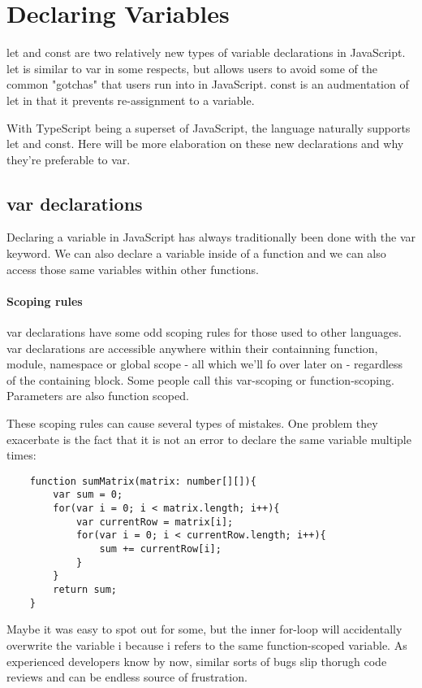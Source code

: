 \chapter{Declaring Variables}
let and const are two relatively new types of variable declarations in JavaScript. let is similar to var in some respects, but allows users to avoid some of the common "gotchas" that users run into in JavaScript. const is an audmentation of let in that it prevents re-assignment to a variable.

With TypeScript being a superset of JavaScript, the language naturally supports let and const. Here will be more elaboration on these new declarations and why they're preferable to var.

\section{var declarations}
Declaring a variable in JavaScript has always traditionally been done with the var keyword. We can also declare a variable inside of a function and we can also access those same variables within other functions.

\subsubsection{Scoping rules}
var declarations have some odd scoping rules for those used to other languages. var declarations are accessible anywhere within their containning function, module, namespace or global scope - all which we'll fo over later on - regardless of the containing block. Some people call this var-scoping or function-scoping. Parameters are also function scoped.

These scoping rules can cause several types of mistakes. One problem they exacerbate is the fact that it is not an error to declare the same variable multiple times:
\begin{lstlisting}
    function sumMatrix(matrix: number[][]){
        var sum = 0;
        for(var i = 0; i < matrix.length; i++){
            var currentRow = matrix[i];
            for(var i = 0; i < currentRow.length; i++){
                sum += currentRow[i];
            }
        }
        return sum;
    }
\end{lstlisting}

Maybe it was easy to spot out for some, but the inner for-loop will accidentally overwrite the variable i because i refers to the same function-scoped variable. As experienced developers know by now, similar sorts of bugs slip thorugh code reviews and can be endless source of frustration.

